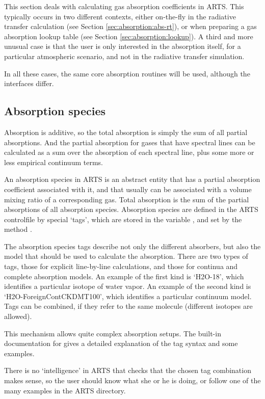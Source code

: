 This section deals with calculating gas absorption coefficients in
ARTS.  This typically occurs in two different contexts, either
on-the-fly in the radiative transfer calculation (see Section
\ref{sec:absorption:abs-rt}), or when preparing a gas absorption
lookup table (see Section \ref{sec:absorption:lookup}).  A third and
more unusual case is that the user is only interested in the
absorption itself, for a particular atmospheric scenario, and not in
the radiative transfer simulation.

In all these cases, the same core absorption routines will be used,
although the interfaces differ. 

\subsection{Absorption species}

Absorption is additive, so the total absorption is simply the sum of
all partial absorptions.  And the partial absorption for gases that
have spectral lines can be calculated as a sum over the absorption of
each spectral line, plus some more or less empirical continuum terms.

An absorption species in ARTS is an abstract entity that has a partial
absorption coefficient associated with it, and that usually can be
associated with a volume mixing ratio of a corresponding gas. Total
absorption is the sum of the partial absorptions of all absorption
species. Absorption species are defined in the ARTS controlfile by
special `tags', which are stored in the variable
, and set by the method .

The absorption species tags describe not only the different absorbers,
but also the model that should be used to calculate the absorption.
There are two types of tags, those for explicit line-by-line
calculations, and those for continua and complete absorption models.
An example of the first kind is `H2O-18', which identifies a
particular isotope of water vapor.  An example of the second kind is
`H2O-ForeignContCKDMT100', which identifies a particular continuum
model.  Tags can be combined, if they refer to the same molecule
(different isotopes are allowed). 

This mechanism allows quite complex
absorption setups. The built-in documentation for
 gives a detailed explanation of the tag syntax
and some examples.  

There is no `intelligence' in ARTS that checks that the chosen tag
combination makes sense, so the user should know what she or he is
doing, or follow one of the many examples in the ARTS
 directory.

